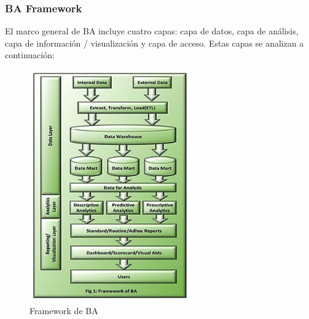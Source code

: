 \documentclass[preprint,12pt]{elsarticle}
\begin{document}
	\subsubsection{\textbf{BA Framework }}
El marco general de BA incluye cuatro capas: capa de datos, capa de análisis, capa de información / visualización y capa de acceso.
Estas capas se analizan a continuación\cite{referenciasosa1}: 
\begin{figure}[htb]
	\begin{center}
		\includegraphics[height=10cm]{./IMAGENES/BAFramework} 
		\caption{Framework de BA}
	\end{center}
\end{figure}
\end{document}
